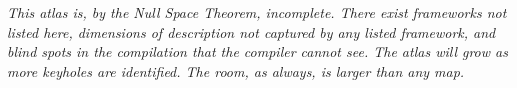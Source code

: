 \bigskip\noindent\makebox[\textwidth]{\color{rulegray}\rule{5cm}{0.3pt}}\bigskip


\textit{This atlas is, by the Null Space Theorem, incomplete. There exist frameworks not listed here, dimensions of description not captured by any listed framework, and blind spots in the compilation that the compiler cannot see. The atlas will grow as more keyholes are identified. The room, as always, is larger than any map.}



